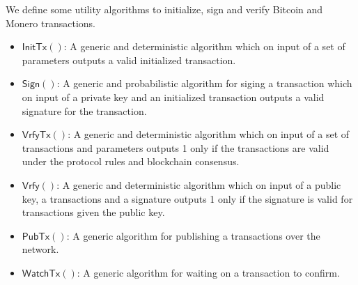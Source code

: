\documentclass{llncs}
\newcommand{\Sign}{\textsf{Sign}}
\newcommand{\Verify}{\textsf{Vrfy}}
\newcommand{\InitTx}{\textsf{InitTx}}
\newcommand{\VrfyTx}{\textsf{VrfyTx}}
\newcommand{\PubTx}{\textsf{PubTx}}
\newcommand{\WatchTx}{\textsf{WatchTx}}
\begin{document}
We define some utility algorithms to initialize, sign and verify Bitcoin and Monero transactions.

\begin{itemize}
    \item $\InitTx()$: A generic and deterministic algorithm which on input of a set of parameters outputs a valid initialized transaction.
    \item $\Sign()$: A generic and probabilistic algorithm for siging a transaction which on input of a private key and an initialized transaction outputs a valid signature for the transaction.
    \item $\VrfyTx()$: A generic and deterministic algorithm which on input of a set of transactions and parameters outputs 1 only if the transactions are valid under the protocol rules and blockchain consensus.
    \item $\Verify()$: A generic and deterministic algorithm which on input of a public key, a transactions and a signature outputs 1 only if the signature is valid for transactions given the public key.
    \item $\PubTx()$: A generic algorithm for publishing a transactions over the network.
    \item $\WatchTx()$: A generic algorithm for waiting on a transaction to confirm.
\end{itemize}

\newpage
\end{document}
